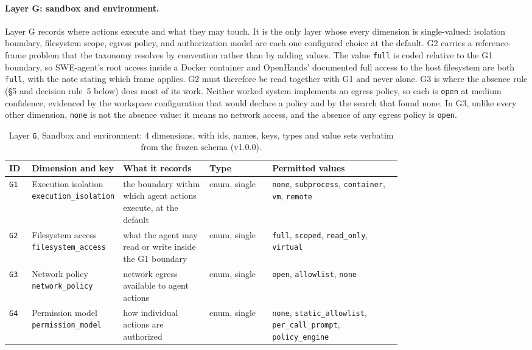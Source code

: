 \paragraph{Layer G: sandbox and environment.}\label{subsec:layer-g}
Layer G records where actions execute and what they may touch. It is the only layer whose every
dimension is single-valued: isolation boundary, filesystem scope, egress policy, and authorization model
are each one configured choice at the default. G2 carries a reference-frame problem that the taxonomy
resolves by convention rather than by adding values. The value \texttt{full} is coded relative to the
G1 boundary, so SWE-agent's root access inside a Docker container and OpenHands' documented full access
to the host filesystem are both \texttt{full}, with the note stating which frame applies. G2 must
therefore be read together with G1 and never alone. G3 is where the absence rule
(\S5 and decision rule~5 below) does most of its work. Neither worked system implements an egress policy, so
each is \texttt{open} at medium confidence, evidenced by the workspace configuration that would declare
a policy and by the search that found none. In G3, unlike every other dimension, \texttt{none} is not
the absence value: it means no network access, and the absence of any egress policy is \texttt{open}.

\begin{table}[htbp]
\caption{Layer \texttt{G}, Sandbox and environment: 4 dimensions, with ids, names, keys, types and value
sets verbatim from the frozen schema (v1.0.0).}
\label{tab:coding-G}
\footnotesize
\begin{tabular}{@{}l p{0.20\linewidth} p{0.22\linewidth} l p{0.33\linewidth}@{}}
\toprule
ID & Dimension and key & What it records & Type & Permitted values \tabularnewline
\midrule
\texttt{G1} & \raggedright Execution isolation \newline \texttt{execution\_isolation} & \raggedright the boundary within which agent actions execute, at the default & enum, single & \raggedright \texttt{none}, \texttt{subprocess}, \texttt{container}, \texttt{vm}, \texttt{remote} \tabularnewline
\texttt{G2} & \raggedright Filesystem access \newline \texttt{filesystem\_access} & \raggedright what the agent may read or write inside the G1 boundary & enum, single & \raggedright \texttt{full}, \texttt{scoped}, \texttt{read\_only}, \texttt{virtual} \tabularnewline
\texttt{G3} & \raggedright Network policy \newline \texttt{network\_policy} & \raggedright network egress available to agent actions & enum, single & \raggedright \texttt{open}, \texttt{allowlist}, \texttt{none} \tabularnewline
\texttt{G4} & \raggedright Permission model \newline \texttt{permission\_model} & \raggedright how individual actions are authorized & enum, single & \raggedright \texttt{none}, \texttt{static\_allowlist}, \texttt{per\_call\_prompt}, \texttt{policy\_engine} \tabularnewline
\bottomrule
\end{tabular}
\end{table}

